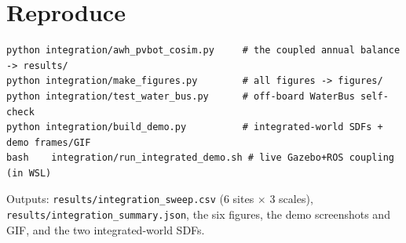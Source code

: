 \documentclass[11pt]{article}
\begin{document}
\section{Reproduce}
\begin{verbatim}
python integration/awh_pvbot_cosim.py     # the coupled annual balance -> results/
python integration/make_figures.py        # all figures -> figures/
python integration/test_water_bus.py      # off-board WaterBus self-check
python integration/build_demo.py          # integrated-world SDFs + demo frames/GIF
bash    integration/run_integrated_demo.sh # live Gazebo+ROS coupling (in WSL)
\end{verbatim}
Outputs: \texttt{results/integration\_sweep.csv} (6 sites $\times$ 3 scales),
\texttt{results/integration\_summary.json}, the six figures, the demo
screenshots and GIF, and the two integrated-world SDFs.
\end{document}
